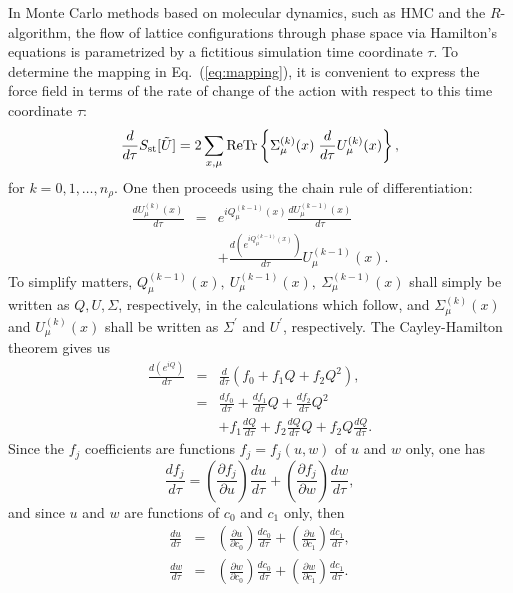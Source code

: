 In Monte Carlo methods based on molecular dynamics, such as HMC\cite{hmc}
and the $R$-algorithm\cite{Ralgorithm}, the flow of lattice configurations
through phase space via Hamilton's equations is 
parametrized by a fictitious simulation time
coordinate $\tau$.  To determine the mapping in Eq.~(\ref{eq:mapping}),
it is convenient to express the force field in terms of the rate of change
of the action with respect to this time coordinate $\tau$:
\begin{equation}
  \frac{d}{d\tau}S_{\rm st}[\tilde{U}] = 2\sum_{x,\mu} \mbox{ReTr} \left\{ 
        \Sigma_\mu^{(k)}(x)   \;
        \frac{d}{d\tau} U^{(k)}_\mu(x) 
\right\}, 
\end{equation}
for $k=0,1,\dots,n_\rho$. One then proceeds using the chain rule of
differentiation:
\begin{eqnarray}
\frac{dU^{(k)}_\mu(x)}{d\tau} &=&  e^{i Q^{(k-1)}_\mu(x)} 
   \frac{dU^{(k-1)}_\mu(x)}{d\tau} \nonumber\\
   &&+ \frac{d(e^{i Q^{(k-1)}_\mu(x)})}{d\tau} U^{(k-1)}_\mu(x).
\end{eqnarray}
To simplify matters, $Q^{(k-1)}_\mu(x),\ U^{(k-1)}_\mu(x),\ \Sigma^{(k-1)}_\mu(x)$
shall simply be written as $Q,U,\Sigma$, respectively,
in the calculations which follow, and $\Sigma^{(k)}_\mu(x)$ and
$U^{(k)}_\mu(x)$ shall be written as $\Sigma^\prime$ and $U^\prime$,
respectively.  The Cayley-Hamilton theorem
gives us
\begin{eqnarray}
    \frac{d(e^{i Q})}{d\tau} &=& \frac{d}{d\tau}
             \left(f_0 + f_1 Q + f_2 Q^2\right),\nonumber\\
   &=& \frac{df_0}{d\tau}+\frac{df_1}{d\tau}Q+\frac{df_2}{d\tau}Q^2\nonumber\\
    &&   + f_1\frac{dQ}{d\tau}+f_2\frac{dQ}{d\tau}Q+f_2Q\frac{dQ}{d\tau}.
\end{eqnarray}
Since the $f_j$ coefficients are functions $f_j=f_j(u,w)$ of $u$
and $w$ only, one has
\begin{equation}
    \frac{df_j}{d\tau} = \left(\frac{\partial f_j}{\partial u}\right)
   \frac{du}{d\tau}
    + \left(\frac{\partial f_j}{\partial w}\right)
   \frac{dw}{d\tau},
\end{equation}
and since $u$ and $w$ are functions of $c_0$ and $c_1$ only, then
\begin{eqnarray}
 \frac{du}{d\tau} &=& \left(\frac{\partial u}{\partial c_0}\right)
   \frac{dc_0}{d\tau}
                     +\left(\frac{\partial u}{\partial c_1}\right)
   \frac{dc_1}{d\tau},\\
 \frac{dw}{d\tau} &=& \left(\frac{\partial w}{\partial c_0}\right)
    \frac{dc_0}{d\tau}
                     +\left(\frac{\partial w}{\partial c_1}\right)
   \frac{dc_1}{d\tau}.
\end{eqnarray}
